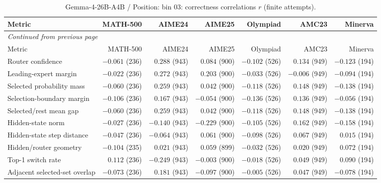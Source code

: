 \begingroup\scriptsize\setlength{\tabcolsep}{4pt}
\begin{longtable}{@{}lrrrrrr@{}}
\caption{Gemma-4-26B-A4B / Position: bin 03: correctness correlations $r$ (finite attempts).}\label{tab:multi-gemma-position-bin_03}\\
\toprule
Metric & MATH-500 & AIME24 & AIME25 & Olympiad & AMC23 & Minerva \\
\midrule\endfirsthead
\multicolumn{7}{l}{\textit{Continued from previous page}}\\
\toprule
Metric & MATH-500 & AIME24 & AIME25 & Olympiad & AMC23 & Minerva \\
\midrule\endhead
\bottomrule\endfoot
Router confidence & $-0.061$ (236) & $0.288$ (943) & $0.084$ (900) & $-0.102$ (526) & $0.134$ (949) & $-0.123$ (194) \\
Leading-expert margin & $-0.022$ (236) & $0.272$ (943) & $0.203$ (900) & $-0.033$ (526) & $-0.006$ (949) & $-0.094$ (194) \\
Selected probability mass & $-0.060$ (236) & $0.259$ (943) & $0.042$ (900) & $-0.118$ (526) & $0.148$ (949) & $-0.138$ (194) \\
Selection-boundary margin & $-0.106$ (236) & $0.167$ (943) & $-0.054$ (900) & $-0.136$ (526) & $0.136$ (949) & $-0.056$ (194) \\
Selected/rest mean gap & $-0.060$ (236) & $0.259$ (943) & $0.042$ (900) & $-0.118$ (526) & $0.148$ (949) & $-0.138$ (194) \\
Hidden-state norm & $-0.027$ (236) & $-0.140$ (943) & $-0.229$ (900) & $-0.105$ (526) & $0.162$ (949) & $-0.158$ (194) \\
Hidden-state step distance & $-0.047$ (236) & $-0.064$ (943) & $0.061$ (900) & $-0.098$ (526) & $0.067$ (949) & $0.015$ (194) \\
Hidden/router geometry & $-0.104$ (235) & $0.021$ (943) & $0.059$ (899) & $-0.032$ (526) & $0.020$ (949) & $0.072$ (194) \\
Top-1 switch rate & $0.112$ (236) & $-0.249$ (943) & $-0.003$ (900) & $-0.018$ (526) & $0.049$ (949) & $0.090$ (194) \\
Adjacent selected-set overlap & $-0.073$ (236) & $0.181$ (943) & $-0.097$ (900) & $-0.005$ (526) & $0.047$ (949) & $-0.078$ (194) \\
\end{longtable}\endgroup

